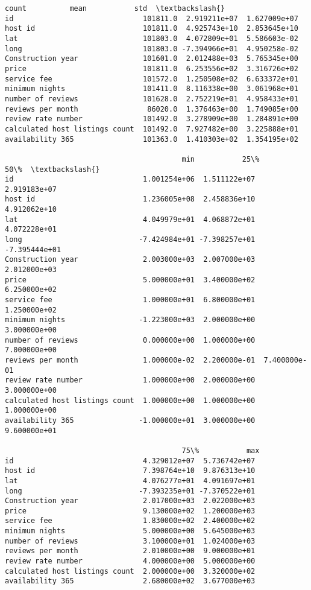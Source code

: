 \documentclass[11pt]{article}
\makeatletter
\newcommand{\boxspacing}{\kern\kvtcb@left@rule\kern\kvtcb@boxsep}
\newcommand{\prompt}[4]{
        {\ttfamily\llap{{\color{#2}[#3]:\hspace{3pt}#4}}\vspace{-\baselineskip}}
    }
\makeatother
\begin{document}
            \begin{tcolorbox}[breakable, size=fbox, boxrule=.5pt, pad at break*=1mm, opacityfill=0]
\prompt{Out}{outcolor}{ }{\boxspacing}
\begin{Verbatim}[commandchars=\\\{\}]
                                   count          mean           std  \textbackslash{}
id                              101811.0  2.919211e+07  1.627009e+07
host id                         101811.0  4.925743e+10  2.853645e+10
lat                             101803.0  4.072809e+01  5.586603e-02
long                            101803.0 -7.394966e+01  4.950258e-02
Construction year               101601.0  2.012488e+03  5.765345e+00
price                           101811.0  6.253556e+02  3.316726e+02
service fee                     101572.0  1.250508e+02  6.633372e+01
minimum nights                  101411.0  8.116338e+00  3.061968e+01
number of reviews               101628.0  2.752219e+01  4.958433e+01
reviews per month                86020.0  1.376463e+00  1.749085e+00
review rate number              101492.0  3.278909e+00  1.284891e+00
calculated host listings count  101492.0  7.927482e+00  3.225888e+01
availability 365                101363.0  1.410303e+02  1.354195e+02

                                         min           25\%           50\%  \textbackslash{}
id                              1.001254e+06  1.511122e+07  2.919183e+07
host id                         1.236005e+08  2.458836e+10  4.912062e+10
lat                             4.049979e+01  4.068872e+01  4.072228e+01
long                           -7.424984e+01 -7.398257e+01 -7.395444e+01
Construction year               2.003000e+03  2.007000e+03  2.012000e+03
price                           5.000000e+01  3.400000e+02  6.250000e+02
service fee                     1.000000e+01  6.800000e+01  1.250000e+02
minimum nights                 -1.223000e+03  2.000000e+00  3.000000e+00
number of reviews               0.000000e+00  1.000000e+00  7.000000e+00
reviews per month               1.000000e-02  2.200000e-01  7.400000e-01
review rate number              1.000000e+00  2.000000e+00  3.000000e+00
calculated host listings count  1.000000e+00  1.000000e+00  1.000000e+00
availability 365               -1.000000e+01  3.000000e+00  9.600000e+01

                                         75\%           max
id                              4.329012e+07  5.736742e+07
host id                         7.398764e+10  9.876313e+10
lat                             4.076277e+01  4.091697e+01
long                           -7.393235e+01 -7.370522e+01
Construction year               2.017000e+03  2.022000e+03
price                           9.130000e+02  1.200000e+03
service fee                     1.830000e+02  2.400000e+02
minimum nights                  5.000000e+00  5.645000e+03
number of reviews               3.100000e+01  1.024000e+03
reviews per month               2.010000e+00  9.000000e+01
review rate number              4.000000e+00  5.000000e+00
calculated host listings count  2.000000e+00  3.320000e+02
availability 365                2.680000e+02  3.677000e+03
\end{Verbatim}
\end{tcolorbox}
        
\end{document}
